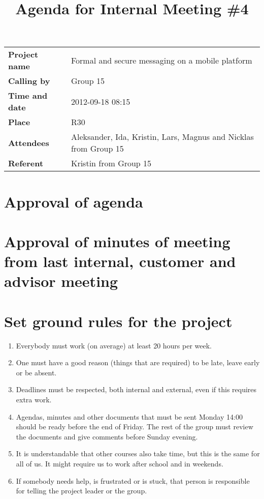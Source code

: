 \documentclass[a4paper,12pt]{article}
\begin{document}
\title{Agenda for Internal Meeting \#4}
\maketitle
\begin{tabular}{>{\bfseries}l l}	
Project name&Formal and secure messaging on a mobile platform\\
Calling by&Group 15\\
Time and date&2012-09-18 08:15\\
Place&R30\\
Attendees&Aleksander, Ida, Kristin, Lars, Magnus and Nicklas from Group 15\\
Referent&Kristin from Group 15\\
\end{tabular}

\section{Approval of agenda}
\section{Approval of minutes of meeting from last internal, customer and advisor meeting}
\section{Set ground rules for the project}
\begin{enumerate}
\item
Everybody must work (on average) at least 20 hours per week.
\item
One must have a good reason (things that are required) to be late, leave early or be absent. 
\item
Deadlines must be respected, both internal and external, even if this requires extra work.
\item
Agendas, minutes and other documents that must be sent Monday 14:00 should be ready before the end of Friday. 
The rest of the group must review the documents and give comments before Sunday evening. 
\item
It is understandable that other courses also take time, but this is the same for all of us.
It might require us to work after school and in weekends.
\item
If somebody needs help, is frustrated or is stuck, that person is responsible for telling the project leader or the group. 
\end{enumerate}
\end{document}
